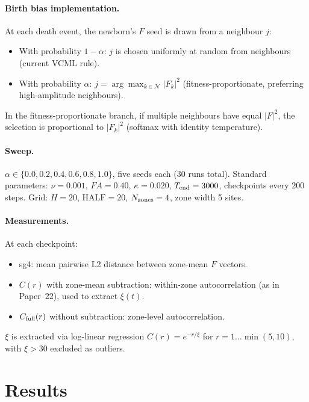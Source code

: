 \documentclass[11pt]{article}
\begin{document}
\paragraph{Birth bias implementation.}
At each death event, the newborn's $F$ seed is drawn from a neighbour $j$:
\begin{itemize}
  \item With probability $1-\alpha$: $j$ is chosen uniformly at random
        from neighbours (current VCML rule).
  \item With probability $\alpha$: $j = \arg\max_{k \in \mathcal{N}}|F_k|^2$
        (fitness-proportionate, preferring high-amplitude neighbours).
\end{itemize}
In the fitness-proportionate branch, if multiple neighbours have equal
$|F|^2$, the selection is proportional to $|F_k|^2$ (softmax with
identity temperature).

\paragraph{Sweep.}
$\alpha \in \{0.0, 0.2, 0.4, 0.6, 0.8, 1.0\}$, five seeds each (30 runs total).
Standard parameters: $\nu=0.001$, $FA=0.40$, $\kappa=0.020$, $T_{\rm end}=3000$,
checkpoints every 200 steps.
Grid: $H=20$, $\mathrm{HALF}=20$, $N_{\rm zones}=4$, zone width 5 sites.

\paragraph{Measurements.}
At each checkpoint:
\begin{itemize}
  \item sg4: mean pairwise L2 distance between zone-mean $F$ vectors.
  \item $C(r)$ with zone-mean subtraction: within-zone autocorrelation
        (as in Paper~22), used to extract $\xi(t)$.
  \item $C_{\rm full}(r)$ without subtraction: zone-level autocorrelation.
\end{itemize}
$\xi$ is extracted via log-linear regression $C(r) = e^{-r/\xi}$ for
$r=1\ldots\min(5, 10)$, with $\xi > 30$ excluded as outliers.

\section{Results}
\end{document}
